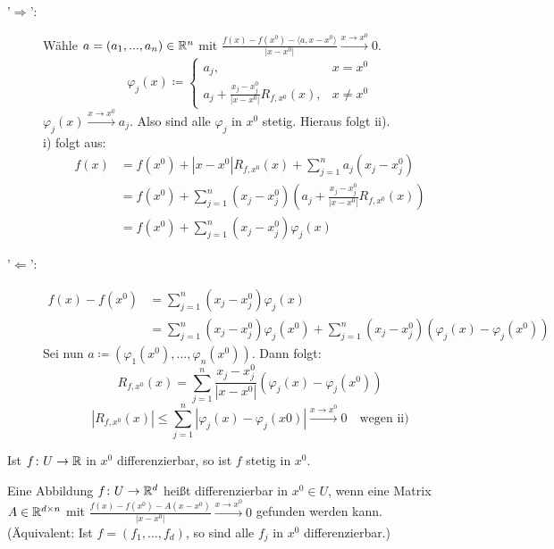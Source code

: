 \vspace{-22pt}
\begin{beweis}
	\begin{description}
		\item['$ \Rightarrow $':] W\"ahle $ a=(a_1,...,a_n)\in\mathbb{R}^n $ mit $ \frac{f(x)-f(x^0)-\langle a,x-x^0\rangle}{|x-x^0|}\xrightarrow{x\to x^0} 0 $.
		\[ \varphi_j(x)\coloneqq \begin{cases}
		a_j,&x=x^0\\a_j+\frac{x_j-x_j^0}{|x-x^0|}R_{f,x^0}(x),& x\neq x^0
		\end{cases} \]
		$ \varphi_j(x)\xrightarrow{x\to x^0}a_j $. Also sind alle $ \varphi_j $ in $ x^0 $ stetig. Hieraus folgt ii).\\
		i) folgt aus:
		\begin{align*} f(x)&=f(x^0)+|x-x^0|R_{f,x^0}(x)+\sum_{j=1}^{n}a_j(x_j-x_j^0)\\&=f(x^0)+\sum_{j=1}^{n}(x_j-x_j^0)\left(a_j+\frac{x_j-x_j^0}{|x-x^0|}R_{f,x^0}(x)\right)\\
		&=f(x^0)+\sum_{j=1}^{n}(x_j-x_j^0)\varphi_j(x)
		\end{align*}
		\item['$ \Leftarrow $':] 
		\begin{align*} f(x)-f(x^0)&=\sum_{j=1}^{n}(x_j-x_j^0)\varphi_j(x)\\
		&=\sum_{j=1}^{n}(x_j-x_j^0)\varphi_j(x^0)+\sum_{j=1}^{n}(x_j-x_j^0)(\varphi_j(x)-\varphi_j(x^0))
		\end{align*}
		Sei nun $ a\coloneqq(\varphi_1(x^0),...,\varphi_n(x^0)) $. Dann folgt:
		\[ R_{f,x^0}(x)=\sum_{j=1}^{n}\frac{x_j-x_j^0}{|x-x^0|}(\varphi_j(x)-\varphi_j(x^0)) \]
		\[ |R_{f,x^0}(x)|\leq\sum_{j=1}^{n}|\varphi_j(x)-\varphi_j(x0)|\xrightarrow{x\to x^0} 0\quad\text{wegen ii)} \]
	\end{description}
\end{beweis}
\begin{korollar}
	Ist $ f\colon U\rightarrow\mathbb{R} $ in $ x^0 $ differenzierbar, so ist $ f $ stetig in $ x^0 $. 
\end{korollar}
\begin{definition}
	Eine Abbildung $ f\colon U\rightarrow\mathbb{R}^d $ hei\ss t differenzierbar in $ x^0\in U $, wenn eine Matrix $ A\in\mathbb{R}^{d\times n} $ mit $ \frac{f(x)-f(x^0)-A(x-x^0)}{|x-x^0|}\xrightarrow{x\to x^0}0 $ gefunden werden kann.\\
	(\"Aquivalent: Ist $ f=(f_1,...,f_d) $, so sind alle $ f_j $ in $ x^0 $ differenzierbar.)
\end{definition}
